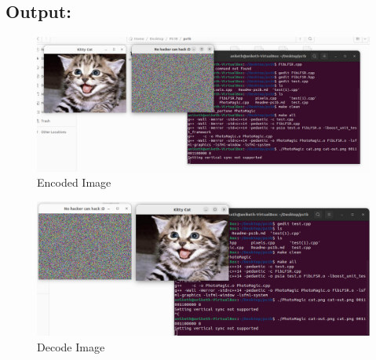 \subsection{Output:}\label{sec:ps1b:output}
\begin{figure}[h]
    \centering
    \includegraphics[width=1\textwidth]{ps1b/Encoded.png}
    \caption{Encoded Image}
    \label{fig:encode}
\end{figure}
\begin{figure}[h]
    \centering
    \includegraphics[width=1\textwidth]{ps1b/Decoded.png}
    \caption{Decode Image}
    \label{fig:decode}
\end{figure}


\newpage

